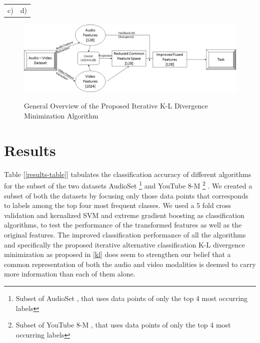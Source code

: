 \documentclass{article}
\begin{document}
\begin{center}
\begin{tabular}{cc}
   c) & d)\\
   \end{tabular}
   \label{fig:kldplots}
\end{center}




\begin{center}
\begin{figure}[h]
\includegraphics[width=1\textwidth]{figures/proposed.png}
\label{fig:genoverview}
\caption{General Overview of the Proposed Iterative K-L Divergence Minimization Algorithm}
\end{figure}
\end{center}

\section{Results}
Table [\ref{results-table}] tabulates the classification accuracy of different algorithms for the subset of the two datasets AudioSet \cite{audioset} \footnote{Subset of AudioSet  \cite{audioset}, that uses data points of only the top 4 most occurring labels}  and YouTube 8-M \cite{youtube8m} \footnote{Subset of YouTube 8-M \cite{youtube8m}, that uses data points of only the top 4 most occurring labels} . We created a subset of both the datasets by focusing only those data points that corresponds to labels among the top four most frequent classes. We used a 5 fold cross validation and kernalized SVM and extreme gradient boosting as classification algorithms, to test the performance of the transformed features as well as the original features. The improved classification performance of all the algorithms and specifically the proposed  iterative alternative classification  K-L divergence minimization as proposed in \ref{kl} does seem to strengthen our belief that a common representation of both the audio and video modalities is deemed to carry more information than each of them alone. 
\end{document}
